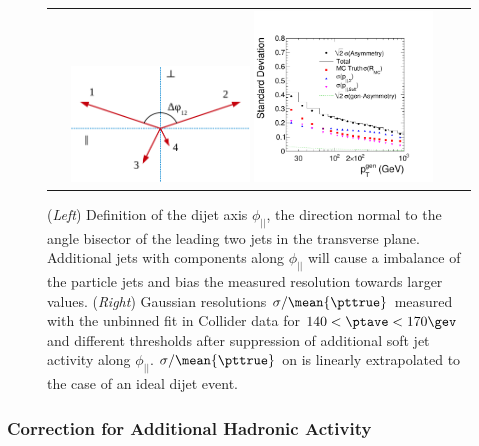 \begin{figure}[ht]
  \centering
  \begin{tabular}{cc}
    \includegraphics[width=0.45\textwidth]{figures/Sketch_Projections}
    \includegraphics[width=0.45\textwidth]{figures/Spring10QCDDiJet_ParallelComponent_hParallelContributions}\\
  \end{tabular}
  \caption{(\textit{Left}) Definition of the dijet axis $\phi_{||}$, the direction normal to the
    angle bisector of the leading two jets in the transverse plane.
    Additional jets with \pt components along $\phi_{||}$ will cause
    a \pt imbalance of the particle jets and bias the measured
    resolution towards larger values.
    (\textit{Right}) Gaussian resolutions \mbox{$\sigma/\mean{\pttrue}$} measured with the unbinned
    fit in Collider data for \mbox{$140 < \ptave < 170\gev$} and different 
    thresholds after suppression of additional soft jet activity along
    $\phi_{||}$. 
    \mbox{$\sigma/\mean{\pttrue}$} on  is linearly
    extrapolated to the case of an ideal dijet event.
  }
  \label{fig:qcd:resolMaxlike:biasAddJets}
\end{figure}


\subsubsection{Correction for Additional Hadronic Activity}\label{sec:ResFit:AddJets:Extrapolation}



